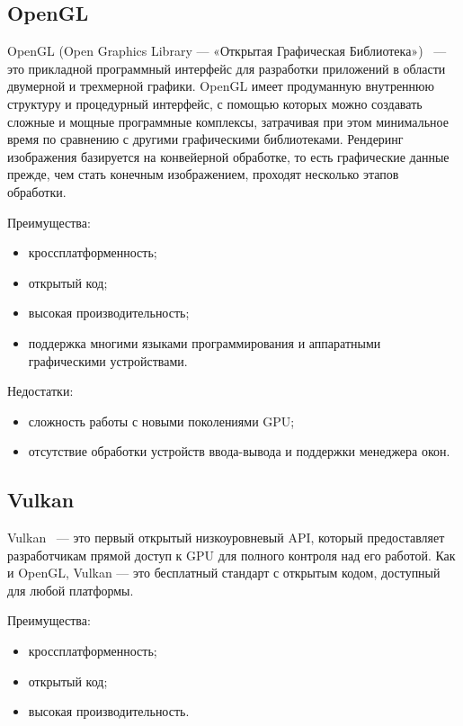 \subsection{OpenGL}

OpenGL (Open Graphics Library --- «Открытая Графическая
Библиотека»)~\cite{bib17} --- это прикладной программный интерфейс для
разработки приложений в области двумерной и трехмерной графики. OpenGL имеет
продуманную внутреннюю структуру и процедурный интерфейс, с помощью которых
можно создавать сложные и мощные программные комплексы, затрачивая при этом
минимальное время по сравнению с другими графическими библиотеками. Рендеринг
изображения базируется на конвейерной обработке, то есть графические данные
прежде, чем стать конечным изображением, проходят несколько этапов обработки.

Преимущества:
\begin{itemize}
    \item кроссплатформенность;
    \item открытый код;
    \item высокая производительность;
    \item поддержка многими языками программирования и аппаратными
        графическими устройствами.
\end{itemize}

Недостатки:
\begin{itemize}
    \item сложность работы с новыми поколениями GPU;
    \item отсутствие обработки устройств ввода-вывода и поддержки менеджера
        окон.
\end{itemize}

\subsection{Vulkan}

Vulkan~\cite{bib17} --- это первый открытый низкоуровневый API, который
предоставляет разработчикам прямой доступ к GPU для полного контроля над его
работой. Как и OpenGL, Vulkan --- это бесплатный стандарт с открытым кодом,
доступный для любой платформы.

Преимущества:
\begin{itemize}
    \item кроссплатформенность;
    \item открытый код;
    \item высокая производительность.
\end{itemize}

